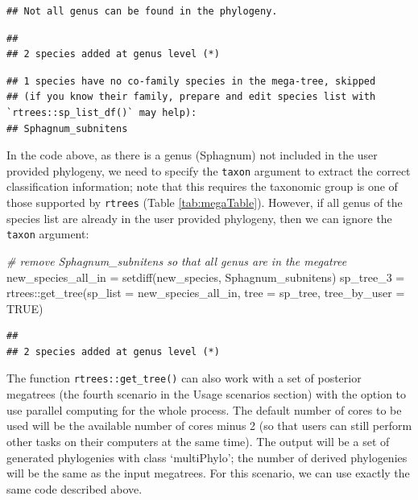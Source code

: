 \documentclass[
  12pt,
]{article}
\newenvironment{Shaded}{\begin{snugshade}}{\end{snugshade}}
\newcommand{\AttributeTok}[1]{\textcolor[rgb]{0.77,0.63,0.00}{#1}}
\newcommand{\CommentTok}[1]{\textcolor[rgb]{0.56,0.35,0.01}{\textit{#1}}}
\newcommand{\ConstantTok}[1]{\textcolor[rgb]{0.00,0.00,0.00}{#1}}
\newcommand{\FunctionTok}[1]{\textcolor[rgb]{0.00,0.00,0.00}{#1}}
\newcommand{\NormalTok}[1]{#1}
\newcommand{\OtherTok}[1]{\textcolor[rgb]{0.56,0.35,0.01}{#1}}
\newcommand{\SpecialCharTok}[1]{\textcolor[rgb]{0.00,0.00,0.00}{#1}}
\newcommand{\StringTok}[1]{\textcolor[rgb]{0.31,0.60,0.02}{#1}}
\begin{document}
\begin{verbatim}
## Not all genus can be found in the phylogeny.
\end{verbatim}

\begin{verbatim}
## 
## 2 species added at genus level (*)
\end{verbatim}

\begin{verbatim}
## 1 species have no co-family species in the mega-tree, skipped
## (if you know their family, prepare and edit species list with `rtrees::sp_list_df()` may help): 
## Sphagnum_subnitens
\end{verbatim}

In the code above, as there is a genus (Sphagnum) not included in the user provided phylogeny, we need to specify the \texttt{taxon} argument to extract the correct classification information; note that this requires the taxonomic group is one of those supported by \texttt{rtrees} (Table \ref{tab:megaTable}). However, if all genus of the species list are already in the user provided phylogeny, then we can ignore the \texttt{taxon} argument:

\begin{Shaded}
\begin{Highlighting}[]
\CommentTok{\# remove Sphagnum\_subnitens so that all genus are in the megatree}
\NormalTok{new\_species\_all\_in }\OtherTok{=} \FunctionTok{setdiff}\NormalTok{(new\_species, }\StringTok{\textquotesingle{}Sphagnum\_subnitens\textquotesingle{}}\NormalTok{)}
\NormalTok{sp\_tree\_3 }\OtherTok{=}\NormalTok{ rtrees}\SpecialCharTok{::}\FunctionTok{get\_tree}\NormalTok{(}\AttributeTok{sp\_list =}\NormalTok{ new\_species\_all\_in, }\AttributeTok{tree =}\NormalTok{ sp\_tree, }
                             \AttributeTok{tree\_by\_user =} \ConstantTok{TRUE}\NormalTok{)}
\end{Highlighting}
\end{Shaded}

\begin{verbatim}
## 
## 2 species added at genus level (*)
\end{verbatim}

The function \texttt{rtrees::get\_tree()} can also work with a set of posterior megatrees (the fourth scenario in the Usage scenarios section) with the option to use parallel computing for the whole process. The default number of cores to be used will be the available number of cores minus 2 (so that users can still perform other tasks on their computers at the same time). The output will be a set of generated phylogenies with class `multiPhylo'; the number of derived phylogenies will be the same as the input megatrees. For this scenario, we can use exactly the same code described above.
\end{document}
